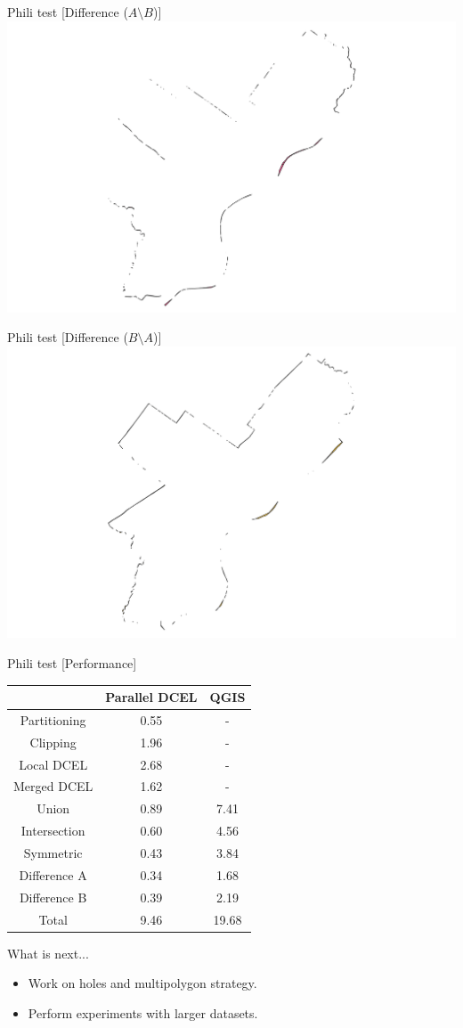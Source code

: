 \documentclass{beamer}
\begin{document}
\begin{frame}{Phili test [Difference ($A \setminus B$)]}
    \centering 
    \includegraphics[trim=6cm 0cm 6cm 0cm, clip, width=0.6\linewidth]{figures/differenceA} 
\end{frame}
\begin{frame}{Phili test [Difference ($B \setminus A$)]}
    \centering 
    \includegraphics[trim=6cm 0cm 6cm 0cm, clip, width=0.6\linewidth]{figures/differenceB} 
\end{frame}

\begin{frame}{Phili test [Performance]}
    \centering 
    \begin{tabular}{|c|c|c|}
        \hline
                        & Parallel DCEL & QGIS \\ \hline
        Partitioning    & 0.55  & - \\
        Clipping        & 1.96  & - \\
        Local DCEL      & 2.68  & - \\
        Merged DCEL     & 1.62  & - \\ \hline
        Union           & 0.89  & 7.41 \\
        Intersection    & 0.60  & 4.56 \\
        Symmetric       & 0.43  & 3.84 \\
        Difference A    & 0.34  & 1.68 \\
        Difference B    & 0.39  & 2.19 \\ \hline
        Total           & 9.46  & 19.68 \\ \hline
    \end{tabular}    
\end{frame}


\begin{frame}{What is next...}
    \begin{itemize}
        \item Work on holes and multipolygon strategy.
        \item Perform experiments with larger datasets.
    \end{itemize}
\end{frame}
\end{document}
